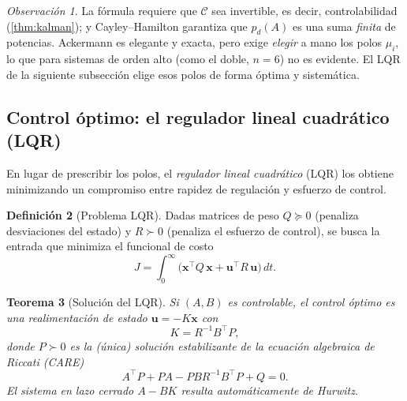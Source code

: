 \documentclass[11pt,letterpaper]{article}
\theoremstyle{definition}
\newtheorem{definicion}{Definición}[section]
\theoremstyle{plain}
\newtheorem{teorema}[definicion]{Teorema}
\theoremstyle{remark}
\newtheorem{observacion}[definicion]{Observación}
\newcommand{\calC}{\mathcal{C}}
\newcommand{\xv}{\bm{x}}
\newcommand{\uv}{\bm{u}}
\begin{document}
\begin{observacion}
La fórmula requiere que $\calC$ sea invertible, es decir, controlabilidad
(\cref{thm:kalman}); y Cayley--Hamilton garantiza que $p_d(A)$ es una
suma \emph{finita} de potencias. Ackermann es elegante y exacta, pero
exige \emph{elegir} a mano los polos $\mu_i$, lo que para sistemas de
orden alto (como el doble, $n=6$) no es evidente. El LQR de la siguiente
subsección elige esos polos de forma óptima y sistemática.
\end{observacion}

\subsection{Control óptimo: el regulador lineal cuadrático (LQR)}
\label{sub:lqr}

En lugar de prescribir los polos, el \emph{regulador lineal cuadrático}
(LQR) los obtiene minimizando un compromiso entre rapidez de regulación y
esfuerzo de control.

\begin{definicion}[Problema LQR]
\label{def:lqr}
Dadas matrices de peso $Q\succeq0$ (penaliza desviaciones del estado) y
$R\succ0$ (penaliza el esfuerzo de control), se busca la entrada que
minimiza el funcional de costo
\begin{equation}\label{eq:Jlqr}
  J=\int_0^{\infty}\bigl(\xv^\top Q\,\xv+\uv^\top R\,\uv\bigr)\,dt.
\end{equation}
\end{definicion}

\begin{teorema}[Solución del LQR]
\label{thm:lqr}
Si $(A,B)$ es controlable, el control óptimo es una realimentación de
estado $\uv=-K\xv$ con
\begin{equation}\label{eq:Klqr}
  K=R^{-1}B^\top P,
\end{equation}
donde $P\succ0$ es la (única) solución estabilizante de la \emph{ecuación
algebraica de Riccati} (CARE)
\begin{equation}\label{eq:care}
  A^\top P+PA-PBR^{-1}B^\top P+Q=0.
\end{equation}
El sistema en lazo cerrado $A-BK$ resulta automáticamente de Hurwitz.
\end{teorema}
\end{document}
